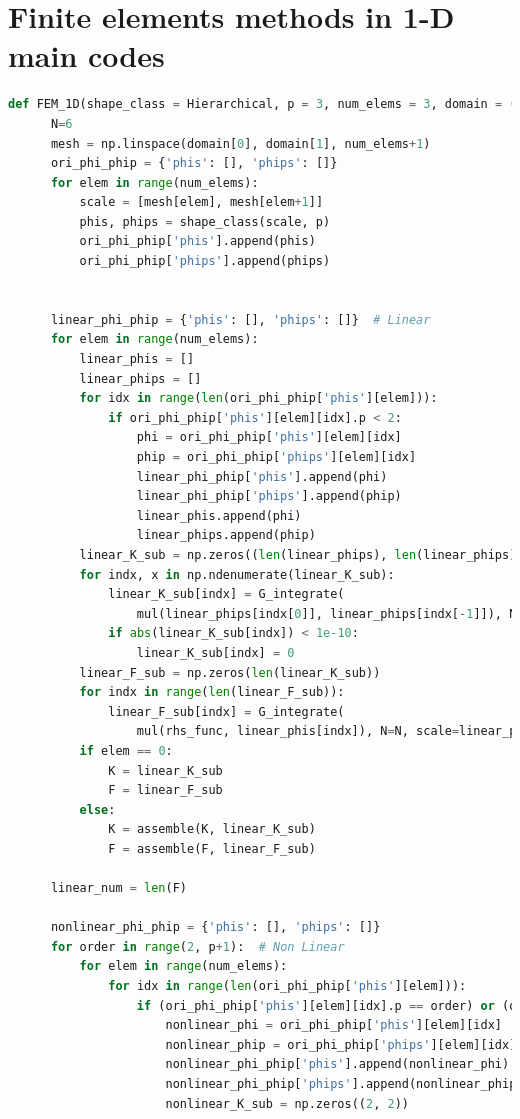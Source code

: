 \documentclass[twoside,twocolumn,10pt]{article}
\begin{document}
\section{Finite elements methods in 1-D main codes}
\label{Apdx:FEM_1D}
\begin{lstlisting}[language=Python, caption=Finite elements methods in 1-D main code]
  def FEM_1D(shape_class = Hierarchical, p = 3, num_elems = 3, domain = (0, 1),rhs_func = rhs_fn(a=50, xb=0.8), exact_func=exact_fn(0.5,0.8), BCs = (0, 0), verbose = False):
      N=6
      mesh = np.linspace(domain[0], domain[1], num_elems+1)
      ori_phi_phip = {'phis': [], 'phips': []}
      for elem in range(num_elems):
          scale = [mesh[elem], mesh[elem+1]]
          phis, phips = shape_class(scale, p)
          ori_phi_phip['phis'].append(phis)
          ori_phi_phip['phips'].append(phips)
  
  
      linear_phi_phip = {'phis': [], 'phips': []}  # Linear
      for elem in range(num_elems):
          linear_phis = []
          linear_phips = []
          for idx in range(len(ori_phi_phip['phis'][elem])):
              if ori_phi_phip['phis'][elem][idx].p < 2:
                  phi = ori_phi_phip['phis'][elem][idx]
                  phip = ori_phi_phip['phips'][elem][idx]
                  linear_phi_phip['phis'].append(phi)
                  linear_phi_phip['phips'].append(phip)
                  linear_phis.append(phi)
                  linear_phips.append(phip)
          linear_K_sub = np.zeros((len(linear_phips), len(linear_phips)))
          for indx, x in np.ndenumerate(linear_K_sub):
              linear_K_sub[indx] = G_integrate(
                  mul(linear_phips[indx[0]], linear_phips[indx[-1]]), N=6, scale=linear_phips[indx[0]].scale)
              if abs(linear_K_sub[indx]) < 1e-10:
                  linear_K_sub[indx] = 0
          linear_F_sub = np.zeros(len(linear_K_sub))
          for indx in range(len(linear_F_sub)):
              linear_F_sub[indx] = G_integrate(
                  mul(rhs_func, linear_phis[indx]), N=N, scale=linear_phis[indx].scale)
          if elem == 0:
              K = linear_K_sub
              F = linear_F_sub
          else:
              K = assemble(K, linear_K_sub)
              F = assemble(F, linear_F_sub)
              
      linear_num = len(F)
  
      nonlinear_phi_phip = {'phis': [], 'phips': []}
      for order in range(2, p+1):  # Non Linear
          for elem in range(num_elems):
              for idx in range(len(ori_phi_phip['phis'][elem])):
                  if (ori_phi_phip['phis'][elem][idx].p == order) or (ori_phi_phip['phips'][elem][idx].p == order):
                      nonlinear_phi = ori_phi_phip['phis'][elem][idx]
                      nonlinear_phip = ori_phi_phip['phips'][elem][idx]
                      nonlinear_phi_phip['phis'].append(nonlinear_phi)
                      nonlinear_phi_phip['phips'].append(nonlinear_phip)
                      nonlinear_K_sub = np.zeros((2, 2))
                      

\end{lstlisting}
\end{document}
